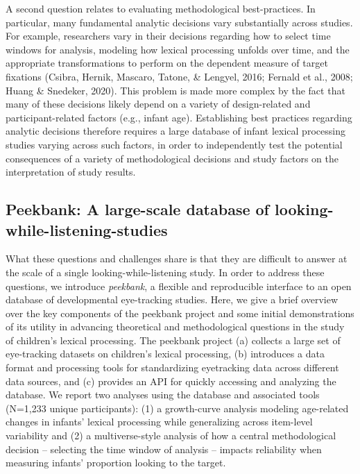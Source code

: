 \documentclass[10pt, letterpaper]{article}
\begin{document}
A second question relates to evaluating methodological best-practices.
In particular, many fundamental analytic decisions vary substantially
across studies. For example, researchers vary in their decisions
regarding how to select time windows for analysis, modeling how lexical
processing unfolds over time, and the appropriate transformations to
perform on the dependent measure of target fixations (Csibra, Hernik,
Mascaro, Tatone, \& Lengyel, 2016; Fernald et al., 2008; Huang \&
Snedeker, 2020). This problem is made more complex by the fact that many
of these decisions likely depend on a variety of design-related and
participant-related factors (e.g., infant age). Establishing best
practices regarding analytic decisions therefore requires a large
database of infant lexical processing studies varying across such
factors, in order to independently test the potential consequences of a
variety of methodological decisions and study factors on the
interpretation of study results.

\hypertarget{peekbank-a-large-scale-database-of-looking-while-listening-studies}{%
\subsection{Peekbank: A large-scale database of
looking-while-listening-studies}\label{peekbank-a-large-scale-database-of-looking-while-listening-studies}}

What these questions and challenges share is that they are difficult to
answer at the scale of a single looking-while-listening study. In order
to address these questions, we introduce \emph{peekbank}, a flexible and
reproducible interface to an open database of developmental eye-tracking
studies. Here, we give a brief overview over the key components of the
peekbank project and some initial demonstrations of its utility in
advancing theoretical and methodological questions in the study of
children's lexical processing. The peekbank project (a) collects a large
set of eye-tracking datasets on children's lexical processing, (b)
introduces a data format and processing tools for standardizing
eyetracking data across different data sources, and (c) provides an API
for quickly accessing and analyzing the database. We report two analyses
using the database and associated tools (N=1,233 unique participants):
(1) a growth-curve analysis modeling age-related changes in infants'
lexical processing while generalizing across item-level variability and
(2) a multiverse-style analysis of how a central methodological decision
-- selecting the time window of analysis -- impacts reliability when
measuring infants' proportion looking to the target.
\end{document}
